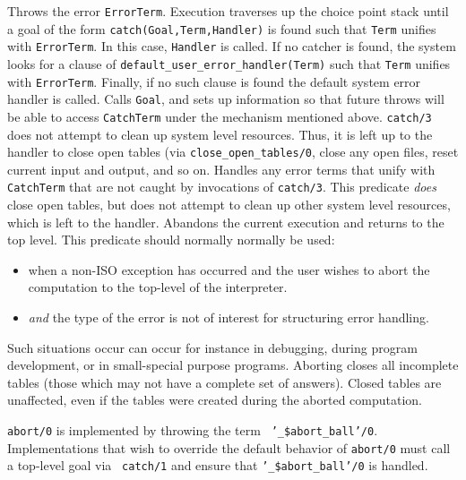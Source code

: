 \begin{description}
Throws the error {\tt ErrorTerm}.  Execution traverses up the choice
point stack until a goal of the form {\tt catch(Goal,Term,Handler)} is
found such that {\tt Term} unifies with {\tt ErrorTerm}.  In this
case, {\tt Handler} is called.  If no catcher is found, the system
looks for a clause of {\tt default\_user\_error\_handler(Term)} such
that {\tt Term} unifies with {\tt ErrorTerm}.  Finally, if no such
clause is found the default system error handler is called.
%
  
Calls {\tt Goal}, and sets up information so that future throws will
be able to access {\tt CatchTerm} under the mechanism mentioned
above. {\tt catch/3} does not attempt to clean up system level
resources.   Thus, it is left up to the handler to close open tables
(via {\tt close\_open\_tables/0}, close any open files, reset current
input and output, and so on.
%
Handles any error terms that unify with {\tt CatchTerm} that are not
caught by invocations of {\tt catch/3}.  This predicate {\em does}
close open tables, but does not attempt to clean up other system level
resources, which is left to the handler.
%
    Abandons the current execution and returns to the top level.  This
    predicate should normally normally be used: 
 \begin{itemize} 
\item when a non-ISO exception has occurred and the user wishes to
abort the computation to the top-level of the interpreter.  
%
\item {\em and} the type of the error is not of interest for
structuring error handling.
\end{itemize}

Such situations occur can occur for instance in debugging, during
program development, or in small-special purpose programs.
    Aborting closes all incomplete tables (those which may not have a 
    complete set of answers).  Closed tables are unaffected, even if 
    the tables were created during the aborted computation.

{\tt abort/0} is implemented by throwing the term {\tt
'\_\$abort\_ball'/0}.  Implementations that wish to override the
default behavior of {\tt abort/0} must call a top-level goal via {\tt
catch/1} and ensure that {\tt '\_\$abort\_ball'/0} is handled.


\end{description}
